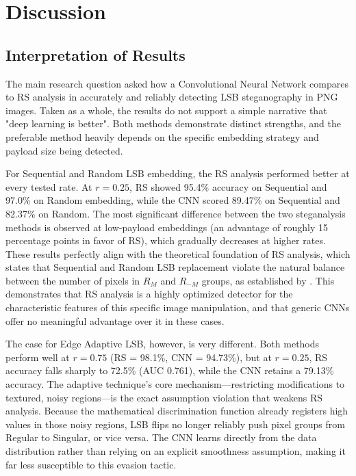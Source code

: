 \chapter{Discussion} \label{cha:discussion}

\section{Interpretation of Results}

The main research question asked how a Convolutional Neural Network compares to RS analysis in accurately and reliably detecting LSB steganography in 
PNG images. 
Taken as a whole, the results do not support a simple narrative that "deep learning is better". 
Both methods demonstrate distinct strengths, and the preferable method heavily depends on the specific embedding strategy and payload size being detected.

For Sequential and Random LSB embedding, the RS analysis performed better at every tested rate. 
At $r = 0.25$, RS showed 95.4\% accuracy on Sequential and 97.0\% on Random embedding, while the CNN scored 89.47\% on Sequential and 82.37\% on Random. 
The most significant difference between the two steganalysis methods is observed at low-payload embeddings (an advantage of roughly 15 percentage points 
in favor of RS), which gradually decreases at higher rates. 
These results perfectly align with the theoretical foundation of RS analysis, which states that Sequential and Random LSB replacement violate the 
natural balance between the number of pixels in $R_M$ and $R_{-M}$ groups, as established by \textcite{Fridrich2001}. 
This demonstrates that RS analysis is a highly optimized detector for the characteristic features of this specific image manipulation, 
and that generic CNNs offer no meaningful advantage over it in these cases.

The case for Edge Adaptive LSB, however, is very different. 
Both methods perform well at $r = 0.75$ (RS = 98.1\%, CNN = 94.73\%), but at $r = 0.25$, RS accuracy falls sharply to 72.5\% (AUC 0.761), while the CNN retains a 79.13\% accuracy. 
The adaptive technique's core mechanism—restricting modifications to textured, noisy regions—is the exact assumption violation that weakens RS analysis. 
Because the mathematical discrimination function already registers high values in those noisy regions, LSB flips no longer reliably push pixel 
groups from Regular to Singular, or vice versa. The CNN learns directly from the data distribution rather than relying on an explicit smoothness 
assumption, making it far less susceptible to this evasion tactic.

